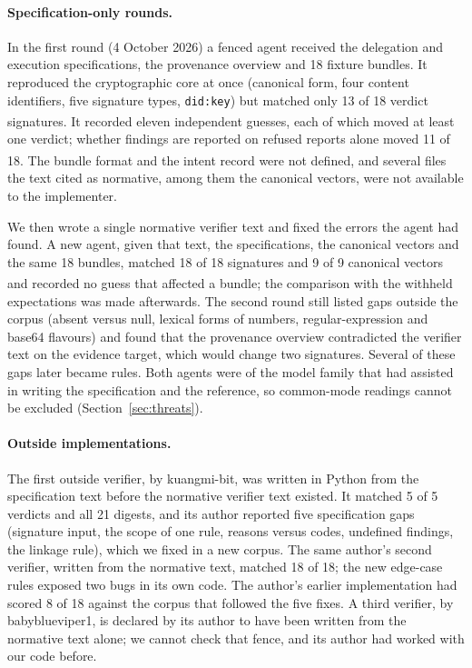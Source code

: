 \documentclass[11pt,a4paper]{article}
\newcommand{\code}[1]{\texttt{#1}}
\newcommand{\priv}{\textsuperscript{\textdagger}}
\begin{document}
\paragraph{Specification-only rounds.} In the first round (4 October 2026) a fenced agent received the delegation and execution specifications, the provenance overview and 18 fixture bundles. It reproduced the cryptographic core at once (canonical form, four content identifiers, five signature types, \code{did:key}) but matched only 13 of 18 verdict signatures\priv. It recorded eleven independent guesses, each of which moved at least one verdict; whether findings are reported on refused reports alone moved 11 of 18\priv. The bundle format and the intent record were not defined, and several files the text cited as normative, among them the canonical vectors, were not available to the implementer.

We then wrote a single normative verifier text and fixed the errors the agent had found. A new agent, given that text, the specifications, the canonical vectors and the same 18 bundles, matched 18 of 18 signatures and 9 of 9 canonical vectors and recorded no guess that affected a bundle\priv; the comparison with the withheld expectations was made afterwards. The second round still listed gaps outside the corpus (absent versus null, lexical forms of numbers, regular-expression and base64 flavours) and found that the provenance overview contradicted the verifier text on the evidence target, which would change two signatures. Several of these gaps later became rules. Both agents were of the model family that had assisted in writing the specification and the reference, so common-mode readings cannot be excluded (Section~\ref{sec:threats}).

\paragraph{Outside implementations.} The first outside verifier, by kuangmi-bit, was written in Python from the specification text before the normative verifier text existed. It matched 5 of 5 verdicts and all 21 digests, and its author reported five specification gaps (signature input, the scope of one rule, reasons versus codes, undefined findings, the linkage rule), which we fixed in a new corpus. The same author's second verifier, written from the normative text, matched 18 of 18; the new edge-case rules exposed two bugs in its own code. The author's earlier implementation had scored 8 of 18 against the corpus that followed the five fixes. A third verifier, by babyblueviper1, is declared by its author to have been written from the normative text alone; we cannot check that fence, and its author had worked with our code before.
\end{document}
